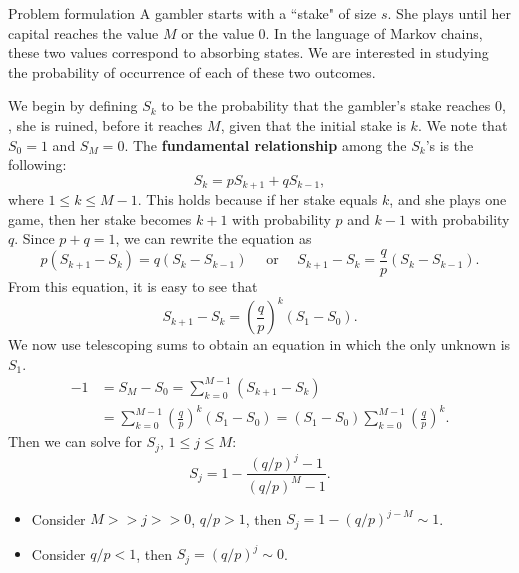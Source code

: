 \begin{newnotion}{Problem formulation}
A gambler starts with a ``stake" of size $s$. She plays until her capital reaches the value $M$ or the value $0$. In the language of Markov chains, these two values correspond to absorbing states. We are interested in studying the probability of occurrence of each of these two outcomes.
\end{newnotion}
We begin by defining $S_k$ to be the probability that the gambler’s stake reaches 0, \ie, she is ruined, before it reaches $M$, given that the initial stake is $k$. We note that $S_0 = 1$ and $S_M = 0$. The \textbf{fundamental relationship} among the $S_k$’s is the following:
\begin{equation*}
    S_{k}= p S_{k+1} + q S_{k-1},
\end{equation*}
where $1 \leq k \leq M-1$. This holds because if her stake equals $k$, and she plays one game, then her stake becomes $k + 1$ with probability $p$ and $k-1$ with probability $q$. Since $p+q = 1$, we can rewrite the equation as 
\begin{equation*}
    p\left(S_{k+1}-S_{k}\right)=q\left(S_{k}-S_{k-1}\right) \quad \text{ or }  \quad 
    S_{k+1}-S_{k}=\frac{q}{p}\left(S_{k}-S_{k-1}\right).
\end{equation*}
From this equation, it is easy to see that
\begin{equation*}
    S_{k+1}-S_{k}=\left(\frac{q}{p}\right)^{k}\left(S_{1}-S_{0}\right). 
\end{equation*}
We now use telescoping sums to obtain an equation in which the only unknown is $S_1$.
\begin{equation*}
    \begin{split}
        -1 &= S_M - S_0 = \sum_{k=0}^{M-1}\left(S_{k+1}-S_{k}\right) \\  
        &= \sum_{k=0}^{M-1}\left(\frac{q}{p}\right)^{k}\left(S_{1}-S_{0}\right) = \left(S_{1}-S_{0}\right) \sum_{k=0}^{M-1}\left(\frac{q}{p}\right)^{k}.
    \end{split}
\end{equation*}
Then we can solve for $S_j$, $1\leq j \leq M$:
\begin{equation*}
    S_{j}=1-\frac{(q / p)^{j}-1}{(q / p)^{M}-1}.
\end{equation*}
\begin{itemize}
    \item Consider $M >> j >> 0$, $q/p >1 $, then $S_j = 1-(q/p)^{j-M} \sim 1$.
    \item Consider $q/p < 1$, then $S_j = (q/p)^j \sim 0$.
\end{itemize}







